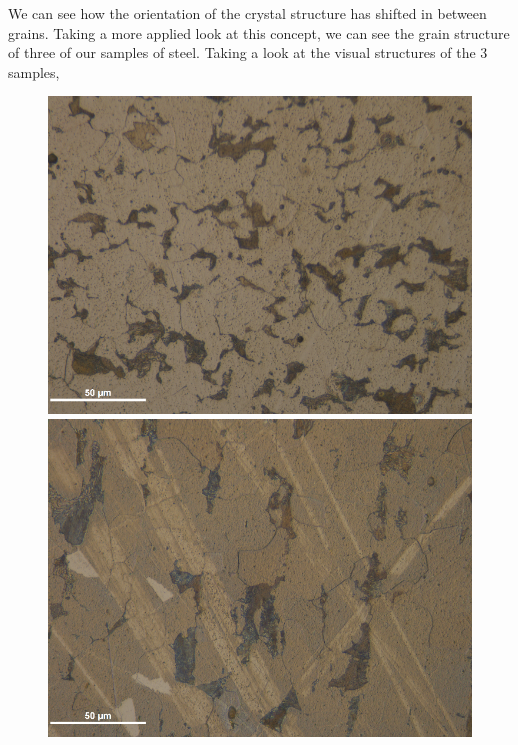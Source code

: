 \documentclass{article}
\begin{document}
We can see how the orientation of the crystal structure has shifted in between grains. Taking a more applied look at this concept, we can see the grain structure of three of our samples of steel. Taking a look at the visual structures of the 3 samples,

\begin{figure}[h]
	\begin{minipage}{0.32\textwidth}
		\centering
		\includegraphics[scale=.5]{TransAnnealedSteel.png}
	\end{minipage}
	\begin{minipage}{0.32\textwidth}
		\centering
		\includegraphics[scale=.5]{LongAnnealedSteel.png}
	\end{minipage}

\end{figure}
\end{document}
